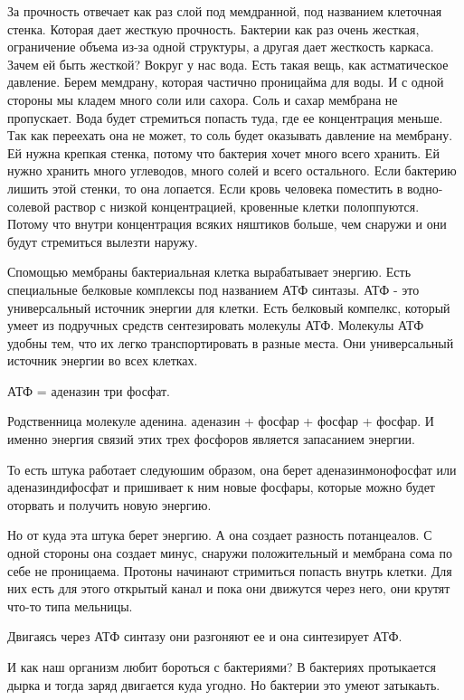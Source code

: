 За прочность отвечает как раз слой под мемдранной, под названием клеточная стенка. Которая 
дает жесткую прочность. Бактерии как раз очень жесткая, ограничение объема из-за 
одной структуры, а другая дает жесткость каркаса. Зачем ей быть жесткой? Вокруг у нас
вода. Есть такая вещь, как астматическое давление. Берем мемдрану, которая 
частично проницайма для воды. И с одной стороны мы кладем много соли или 
сахора. Соль и сахар мембрана не пропускает. Вода будет стремиться попасть туда, 
где ее концентрация меньше. Так как переехать она не может, 
то соль будет оказывать давление на мембрану. Ей нужна крепкая стенка, 
потому что бактерия хочет много всего хранить. Ей нужно хранить много углеводов, 
много солей и всего остального. Если бактерию лишить этой стенки, то она лопается. 
Если кровь человека поместить в водно-солевой раствор с низкой концентрацией, кровенные 
клетки полоппуются. Потому что внутри концентрация всяких няштиков больше, чем снаружи и
они будут стремиться вылезти наружу. 

Спомощью мембраны бактериальная клетка вырабатывает энергию. Есть
специальные белковые комплексы под названием АТФ синтазы. АТФ - это
универсальный источник энергии для клетки. Есть белковый компелкс,
который умеет из подручных средств сентезировать молекулы АТФ.
Молекулы АТФ удобны тем, что их легко транспортировать в разные места.
Они универсальный источник энергии во всех клетках.

АТФ = аденазин три фосфат.

Родственница молекуле аденина. аденазин + фосфар + фосфар + фосфар. И именно
энергия связий этих трех фосфоров является запасанием энергии.

То есть штука работает следуюшим образом, она берет аденазинмонофосфат или 
аденазиндифосфат и пришивает к ним новые фосфары, которые можно будет оторвать
и получить новую энергию.

Но от куда эта штука берет энергию. А она создает разность потанцеалов. С одной
стороны она создает минус, снаружи положительный и мембрана сома по себе не
проницаема. Протоны начинают стримиться попасть внутрь клетки. Для них есть
для этого открытый канал и пока они движутся через него, они крутят что-то типа мельницы.

Двигаясь через АТФ синтазу они разгоняют ее и она синтезирует АТФ.

И как наш организм любит бороться с бактериями? В бактериях протыкается
дырка и тогда заряд двигается куда угодно. Но бактерии это умеют затыкаьть.

